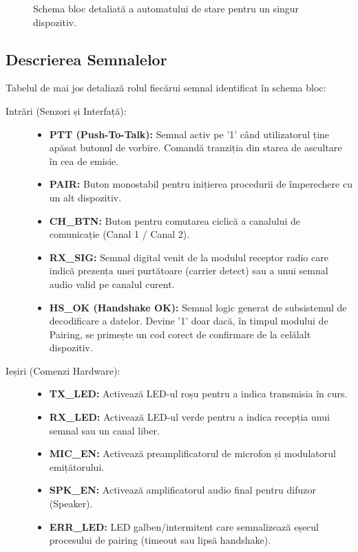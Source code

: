 \begin{figure}[H]
    \caption{Schema bloc detaliată a automatului de stare pentru un singur dispozitiv.}
    \label{fig:asm_block}
\end{figure}

\newpage

\subsection{Descrierea Semnalelor}

Tabelul de mai jos detaliază rolul fiecărui semnal identificat în schema bloc:

\begin{description}
    \item[Intrări (Senzori și Interfață):] \hfill
    \begin{itemize}
        \item \textbf{PTT (Push-To-Talk):} Semnal activ pe '1' când utilizatorul ține apăsat butonul de vorbire. Comandă tranziția din starea de ascultare în cea de emisie.
        \item \textbf{PAIR:} Buton monostabil pentru inițierea procedurii de împerechere cu un alt dispozitiv.
        \item \textbf{CH\_BTN:} Buton pentru comutarea ciclică a canalului de comunicație (Canal 1 / Canal 2).
        \item \textbf{RX\_SIG:} Semnal digital venit de la modulul receptor radio care indică prezența unei purtătoare (carrier detect) sau a unui semnal audio valid pe canalul curent.
        \item \textbf{HS\_OK (Handshake OK):} Semnal logic generat de subsistemul de decodificare a datelor. Devine '1' doar dacă, în timpul modului de Pairing, se primește un cod corect de confirmare de la celălalt dispozitiv.
    \end{itemize}
    
    \item[Ieșiri (Comenzi Hardware):] \hfill
    \begin{itemize}
        \item \textbf{TX\_LED:} Activează LED-ul roșu pentru a indica transmisia în curs.
        \item \textbf{RX\_LED:} Activează LED-ul verde pentru a indica recepția unui semnal sau un canal liber.
        \item \textbf{MIC\_EN:} Activează preamplificatorul de microfon și modulatorul emițătorului.
        \item \textbf{SPK\_EN:} Activează amplificatorul audio final pentru difuzor (Speaker).
        \item \textbf{ERR\_LED:} LED galben/intermitent care semnalizează eșecul procesului de pairing (timeout sau lipsă handshake).
    \end{itemize}
\end{description}


